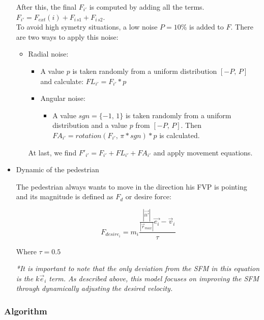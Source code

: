 \documentclass[english]{article}
\numberwithin{equation}{section}
\numberwithin{figure}{section}
\begin{document}
\begin{itemize}
\begin{itemize}
\end{itemize}

After this, the final $F_{i'}$ is computed by adding all the terms.
$F_{i'}=F_{ext}(i)+F_{i\, s1}+F_{i\, s2}$.\\



To avoid high symetry situations, a low noise $P=10\%$ is added to
$F$. There are two ways to apply this noise:
\begin{itemize}
\item Radial noise:

\begin{itemize}
\item A value $p$ is taken randomly from a uniform distribution $[-P,\, P]$
and calculate: $FL_{i'}=F_{i'}*p$
\item Angular noise:

\begin{itemize}
\item A value $sgn=\{-1,\,1\}$ is taken randomly from a uniform distribution
and a value $p$ from $[-P,\, P]$. Then $FA_{i'}=rotation(F_{i'},\,\pi*sgn)*p$
is calculated.
\end{itemize}
\end{itemize}

At last, we find $F'_{i'}=F_{i'}+FL_{i'}+FA_{i'}$ and apply movement
equations.

\end{itemize}
\item Dynamic of the pedestrian


The pedestrian always wants to move in the direction his FVP is pointing
and its magnitude is defined as $F_{d}$ or desire force:


\[
F_{desire_{i}}=m_{i}\frac{\frac{|\vec{ii'}|}{|\vec{r}_{max}|}\vec{e_{i}}-\vec{v}_{i}}{\tau}
\]



Where $\tau=0.5$

\textit{*It is important to note that the only deviation from the SFM in this
equation is the $k\vec{e}_i$ term. As described above, this model focuses on improving
the SFM through dynamically adjusting the desired velocity.}

\end{itemize}

\subsubsection{Algorithm}
\end{document}
